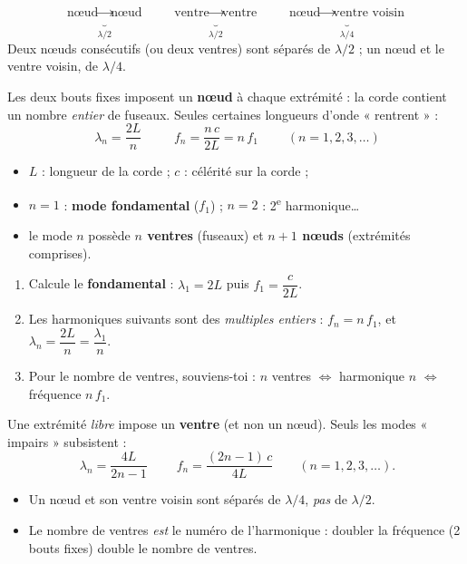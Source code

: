 \documentclass[11pt,a4paper]{article}
\begin{document}
\begin{cle}
\[ \underbrace{\text{nœud} \to \text{nœud}}_{\lambda/2}\qquad
   \underbrace{\text{ventre} \to \text{ventre}}_{\lambda/2}\qquad
   \underbrace{\text{nœud} \to \text{ventre voisin}}_{\lambda/4} \]
Deux nœuds consécutifs (ou deux ventres) sont séparés de $\lambda/2$ ; un nœud et le ventre
voisin, de $\lambda/4$.
\end{cle}

\begin{cle}
Les deux bouts fixes imposent un \textbf{nœud} à chaque extrémité : la corde contient un nombre
\emph{entier} de fuseaux. Seules certaines longueurs d'onde « rentrent » :
\[ \boxed{\;\lambda_n = \frac{2L}{n}\;}\qquad
   \boxed{\;f_n = \frac{n\,c}{2L}=n\,f_1\;}\qquad (n=1,2,3,\dots) \]
\begin{itemize}[leftmargin=1.4em,topsep=2pt,itemsep=1.5pt]
  \item $L$ : longueur de la corde ; $c$ : célérité sur la corde ;
  \item $n=1$ : \textbf{mode fondamental} ($f_1$) ; $n=2$ : 2\textsuperscript{e} harmonique\ldots
  \item le mode $n$ possède \textbf{$n$ ventres} (fuseaux) et \textbf{$n+1$ nœuds}
        (extrémités comprises).
\end{itemize}
\end{cle}

\begin{methode}
\begin{enumerate}[leftmargin=1.6em,topsep=2pt,itemsep=1.5pt,label=\arabic*.]
  \item Calcule le \textbf{fondamental} : $\lambda_1=2L$ puis $f_1=\dfrac{c}{2L}$.
  \item Les harmoniques suivants sont des \emph{multiples entiers} : $f_n=n\,f_1$,
        et $\lambda_n=\dfrac{2L}{n}=\dfrac{\lambda_1}{n}$.
  \item Pour le nombre de ventres, souviens-toi : $n$ ventres $\Leftrightarrow$ harmonique $n$
        $\Leftrightarrow$ fréquence $n\,f_1$.
\end{enumerate}
\end{methode}

\begin{cle}
Une extrémité \emph{libre} impose un \textbf{ventre} (et non un nœud). Seuls les modes
« impairs » subsistent :
\[ \boxed{\;\lambda_n=\frac{4L}{2n-1}\;}\qquad
   f_n=\frac{(2n-1)\,c}{4L}\qquad (n=1,2,3,\dots). \]
\end{cle}

\begin{piege}
\begin{itemize}[leftmargin=1.4em,topsep=2pt,itemsep=1.5pt]
  \item Un nœud et son ventre voisin sont séparés de $\lambda/4$, \emph{pas} de $\lambda/2$.
  \item Le nombre de ventres \emph{est} le numéro de l'harmonique : doubler la fréquence
        (2 bouts fixes) double le nombre de ventres.
\end{itemize}
\end{piege}
\end{document}
